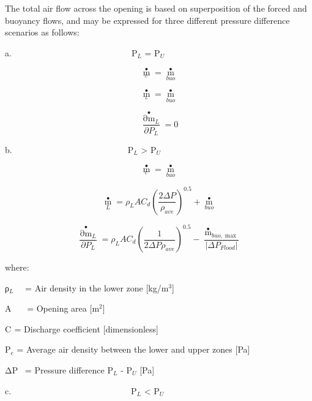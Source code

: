 The total air flow across the opening is based on superposition of the forced and buoyancy flows, and may be expressed for three different pressure difference scenarios as follows:

a.~~~~~~~~~~~~~~~~~~~~~~~~~~~~P\(_{L}\) = P\(_{U}\)

\begin{equation}
{\mathop m\limits^ \bullet_{_U}} = {\mathop m\limits^ \bullet_{buo}}
\end{equation}

\begin{equation}
{\mathop m\limits^ \bullet_{_L}} = {\mathop m\limits^ \bullet_{buo}}
\end{equation}

\begin{equation}
\frac{{{{\mathop {\partial m}\limits^ \bullet  }_L}}}{{\partial {P_L}}} = 0
\end{equation}

b.~~~~~~~~~~~~~~~~~~~~~~~~~~~P\(_{L}\) \textgreater{} P\(_{U}\)

\begin{equation}
{\mathop m\limits^ \bullet_{_U}} = {\mathop m\limits^ \bullet_{buo}}
\end{equation}

\begin{equation}
{\mathop m\limits^ \bullet_L} = {\rho_L}A{C_d}{\left( {\frac{{2\Delta P}}{{{\rho_{ave}}}}} \right)^{0.5}} + {\mathop m\limits^ \bullet_{buo}}
\end{equation}

\begin{equation}
\frac{{{{\mathop {\partial m}\limits^ \bullet  }_L}}}{{\partial {P_L}}} = {\rho_L}A{C_d}{\left( {\frac{1}{{2\Delta P{\rho_{ave}}}}} \right)^{0.5}} - \frac{{{{\mathop m\limits^ \bullet  }_{buo,\max }}}}{{\left| {\Delta {P_{Flood}}} \right|}}
\end{equation}

where:

ρ\(_{L}\)~~ = Air density in the lower zone {[}kg/m\(^{3}\){]}

A~~~ = Opening area {[}m\(^{2}\){]}

C\(_{ }\) = Discharge coefficient {[}dimensionless{]}

Ρ\(_{e}\) = Average air density between the lower and upper zones {[}Pa{]}

ΔP~ = Pressure difference P\(_{L}\) - P\(_{U}\) {[}Pa{]}

c.~~~~~~~~~~~~~~~~~~~~~~~~~~~~P\(_{L}\) \textless{} P\(_{U}\)

